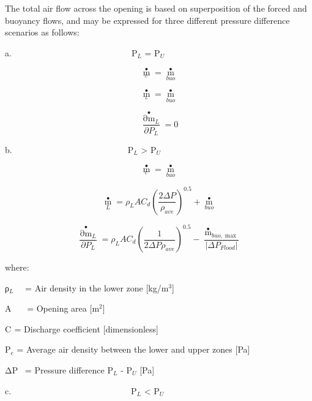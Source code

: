 The total air flow across the opening is based on superposition of the forced and buoyancy flows, and may be expressed for three different pressure difference scenarios as follows:

a.~~~~~~~~~~~~~~~~~~~~~~~~~~~~P\(_{L}\) = P\(_{U}\)

\begin{equation}
{\mathop m\limits^ \bullet_{_U}} = {\mathop m\limits^ \bullet_{buo}}
\end{equation}

\begin{equation}
{\mathop m\limits^ \bullet_{_L}} = {\mathop m\limits^ \bullet_{buo}}
\end{equation}

\begin{equation}
\frac{{{{\mathop {\partial m}\limits^ \bullet  }_L}}}{{\partial {P_L}}} = 0
\end{equation}

b.~~~~~~~~~~~~~~~~~~~~~~~~~~~P\(_{L}\) \textgreater{} P\(_{U}\)

\begin{equation}
{\mathop m\limits^ \bullet_{_U}} = {\mathop m\limits^ \bullet_{buo}}
\end{equation}

\begin{equation}
{\mathop m\limits^ \bullet_L} = {\rho_L}A{C_d}{\left( {\frac{{2\Delta P}}{{{\rho_{ave}}}}} \right)^{0.5}} + {\mathop m\limits^ \bullet_{buo}}
\end{equation}

\begin{equation}
\frac{{{{\mathop {\partial m}\limits^ \bullet  }_L}}}{{\partial {P_L}}} = {\rho_L}A{C_d}{\left( {\frac{1}{{2\Delta P{\rho_{ave}}}}} \right)^{0.5}} - \frac{{{{\mathop m\limits^ \bullet  }_{buo,\max }}}}{{\left| {\Delta {P_{Flood}}} \right|}}
\end{equation}

where:

ρ\(_{L}\)~~ = Air density in the lower zone {[}kg/m\(^{3}\){]}

A~~~ = Opening area {[}m\(^{2}\){]}

C\(_{ }\) = Discharge coefficient {[}dimensionless{]}

Ρ\(_{e}\) = Average air density between the lower and upper zones {[}Pa{]}

ΔP~ = Pressure difference P\(_{L}\) - P\(_{U}\) {[}Pa{]}

c.~~~~~~~~~~~~~~~~~~~~~~~~~~~~P\(_{L}\) \textless{} P\(_{U}\)

